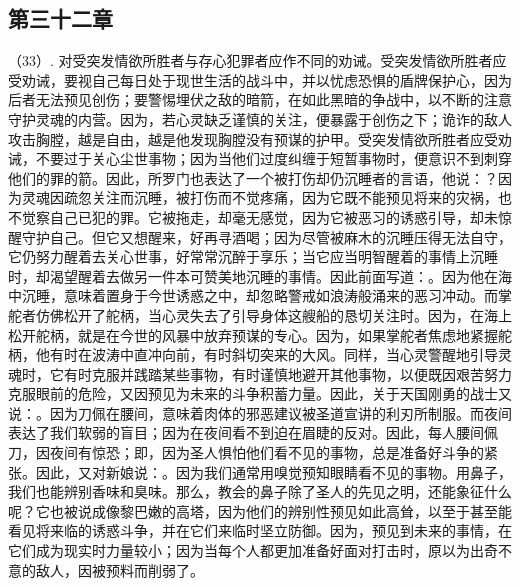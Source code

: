 
\subsection{第三十二章}

\par

（33）. 对受突发情欲所胜者与存心犯罪者应作不同的劝诫。受突发情欲所胜者应受劝诫，要视自己每日处于现世生活的战斗中，并以忧虑恐惧的盾牌保护心，因为后者无法预见创伤；要警惕埋伏之敌的暗箭，在如此黑暗的争战中，以不断的注意守护灵魂的内营。因为，若心灵缺乏谨慎的关注，便暴露于创伤之下；诡诈的敌人攻击胸膛，越是自由，越是他发现胸膛没有预谋的护甲。受突发情欲所胜者应受劝诫，不要过于关心尘世事物；因为当他们过度纠缠于短暂事物时，便意识不到刺穿他们的罪的箭。因此，所罗门也表达了一个被打伤却仍沉睡者的言语，他说：？因为灵魂因疏忽关注而沉睡，被打伤而不觉疼痛，因为它既不能预见将来的灾祸，也不觉察自己已犯的罪。它被拖走，却毫无感觉，因为它被恶习的诱惑引导，却未惊醒守护自己。但它又想醒来，好再寻酒喝；因为尽管被麻木的沉睡压得无法自守，它仍努力醒着去关心世事，好常常沉醉于享乐；当它应当明智醒着的事情上沉睡时，却渴望醒着去做另一件本可赞美地沉睡的事情。因此前面写道：。因为他在海中沉睡，意味着置身于今世诱惑之中，却忽略警戒如浪涛般涌来的恶习冲动。而掌舵者仿佛松开了舵柄，当心灵失去了引导身体这艘船的恳切关注时。因为，在海上松开舵柄，就是在今世的风暴中放弃预谋的专心。因为，如果掌舵者焦虑地紧握舵柄，他有时在波涛中直冲向前，有时斜切突来的大风。同样，当心灵警醒地引导灵魂时，它有时克服并践踏某些事物，有时谨慎地避开其他事物，以便既因艰苦努力克服眼前的危险，又因预见为未来的斗争积蓄力量。因此，关于天国刚勇的战士又说：。因为刀佩在腰间，意味着肉体的邪恶建议被圣道宣讲的利刃所制服。而夜间表达了我们软弱的盲目；因为在夜间看不到迫在眉睫的反对。因此，每人腰间佩刀，因夜间有惊恐；即，因为圣人惧怕他们看不见的事物，总是准备好斗争的紧张。因此，又对新娘说：。因为我们通常用嗅觉预知眼睛看不见的事物。用鼻子，我们也能辨别香味和臭味。那么，教会的鼻子除了圣人的先见之明，还能象征什么呢？它也被说成像黎巴嫩的高塔，因为他们的辨别性预见如此高耸，以至于甚至能看见将来临的诱惑斗争，并在它们来临时坚立防御。因为，预见到未来的事情，在它们成为现实时力量较小；因为当每个人都更加准备好面对打击时，原以为出奇不意的敌人，因被预料而削弱了。\par

